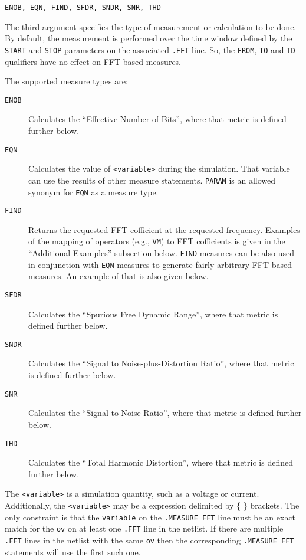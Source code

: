 \begin{Command}
\begin{Arguments}

\texttt{ENOB, EQN, FIND, SFDR, SNDR, SNR, THD}

The third argument specifies the type of measurement or calculation to
be done. By default, the measurement is performed over the time window defined
by the {\tt START} and {\tt STOP} parameters on the associated {\tt .FFT}
line.  So, the  {\tt FROM}, {\tt TO} and {\tt TD} qualifiers have no
effect on FFT-based measures.

The supported measure types are:

\begin{description}
  \item[\tt ENOB] Calculates the ``Effective Number of Bits'', where that metric
    is defined further below.

  \item[\tt EQN] Calculates the value of {\tt <variable>} during the simulation.
    That variable can use the results of other measure statements. {\tt PARAM}
    is an allowed synonym for {\tt EQN} as a measure type.

  \item[\tt FIND] Returns the requested FFT cofficient at the requested
    frequency.  Examples of the mapping of \Xyce{} operators (e.g., {\tt VM})
    to FFT cofficients is given in the ``Additional Examples'' subsection below.
    {\tt FIND} measures can be also used in conjunction with {\tt EQN} measures
    to generate fairly arbitrary FFT-based measures.  An example of that is also
    given below.

  \item[\tt SFDR] Calculates the ``Spurious Free Dynamic Range'', where that metric
    is defined further below.

  \item[\tt SNDR] Calculates the ``Signal to Noise-plus-Distortion Ratio'', where that metric
    is defined further below.

  \item[\tt SNR] Calculates the ``Signal to Noise Ratio'', where that metric
    is defined further below.

  \item[\tt THD] Calculates the ``Total Harmonic Distortion'', where that metric
    is defined further below.
\end{description}


The \texttt{<variable>} is a simulation quantity, such as a
voltage or current.  Additionally, the \texttt{<variable>} may be
a \Xyce{} expression delimited by \{ \} brackets.  The only constraint
is that the \texttt{variable} on the \texttt{.MEASURE FFT} line must
be an exact match for the \texttt{ov} on at least one \texttt{.FFT} line
in the netlist.  If there are multiple \texttt{.FFT} lines in the netlist
with the same \texttt{ov} then the corresponding \texttt{.MEASURE FFT}
statements will use the first such one.


\end{Arguments}
\end{Command}
